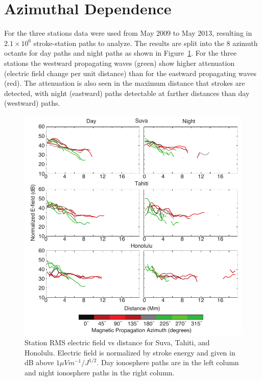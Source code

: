 \section{Azimuthal Dependence}

For the three stations data were used from May 2009 to May 2013, resulting in $2.1\times10^6$ stroke-station paths to analyze.
The results are split into the 8 azimuth octants for day paths and night paths as shown in Figure~\ref{azimuth:fig:azimuth}.
For the three stations the westward propagating waves (green) show higher attenuation (electric field change per unit distance) than for the eastward propagating waves (red).
The attenuation is also seen in the maximum distance that strokes are detected, with night (eastward) paths detectable at farther distances than day (westward) paths.

 \begin{figure}[h!t]
   \centering
   \includegraphics[scale=1]{Azimuth/Figures/e-field_3.pdf} 
   \caption{Station RMS electric field vs distance for Suva, Tahiti, and Honolulu.
   	Electric field is normalized by stroke energy and given in dB above $1 \mu Vm^{-1}/J^{1/2}$.
	Day ionosphere paths are in the left column and night ionosphere paths in the right column.}
   \label{azimuth:fig:azimuth}
\end{figure}

